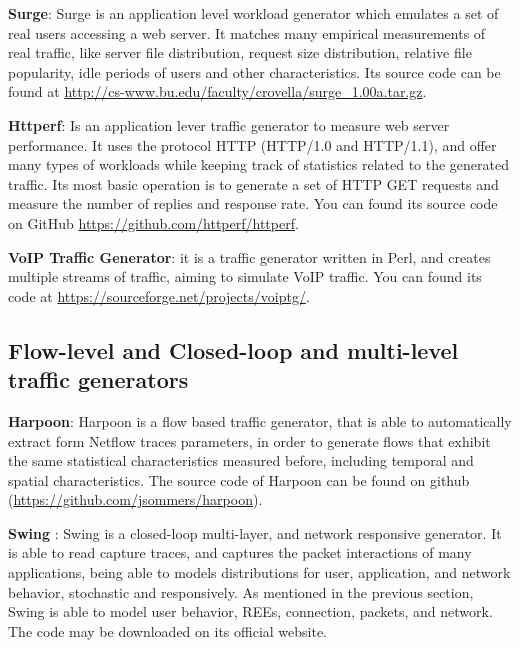 \textbf{Surge}\cite{surge-paper}: Surge is an application level workload generator which emulates a set of real users accessing a web server. It matches many empirical measurements of real traffic, like server file distribution, request size distribution, relative file popularity, idle periods of users and other characteristics. Its source code can be  found at \href{http://cs-www.bu.edu/faculty/crovella/surge_1.00a.tar.gz}{http://cs-www.bu.edu/faculty/crovella/surge\_1.00a.tar.gz}. 

\textbf{Httperf}\cite{web-httperf}: Is an application lever traffic generator to measure web server performance. It uses the protocol HTTP (HTTP/1.0 and HTTP/1.1), and offer many types of workloads while keeping track of statistics related to the generated traffic. Its most basic operation is to generate a set of HTTP GET requests and measure the number of replies and response rate.  You can found its source code on GitHub \href{https://github.com/httperf/httperf}{https://github.com/httperf/httperf}. 

\textbf{VoIP Traffic Generator}: it is a traffic generator written in Perl, and creates multiple streams of traffic,  aiming to simulate VoIP traffic. You can found its code at \href{
https://sourceforge.net/projects/voiptg/}{
https://sourceforge.net/projects/voiptg/}.


\subsection{Flow-level and Closed-loop and multi-level traffic generators}

\textbf{Harpoon}\cite{harpoon-paper}: Harpoon is a flow based traffic generator, that is able to 
automatically extract form Netflow traces parameters, in order to generate flows that exhibit the same statistical characteristics measured before, including temporal and spatial characteristics. The source code of Harpoon can be found on github (\href{https://github.com/jsommers/harpoon}{https://github.com/jsommers/harpoon}).

\textbf{Swing}\cite{swing-paper} \cite{web-swing}: Swing is a closed-loop multi-layer, and network responsive generator. It is able to read capture traces, and captures the packet interactions of many applications, being able to models distributions for user, application, and network behavior, stochastic and responsively. As mentioned in the previous section, Swing is able to model user behavior, REEs, connection, packets, and network. The code may be downloaded on its official website.


